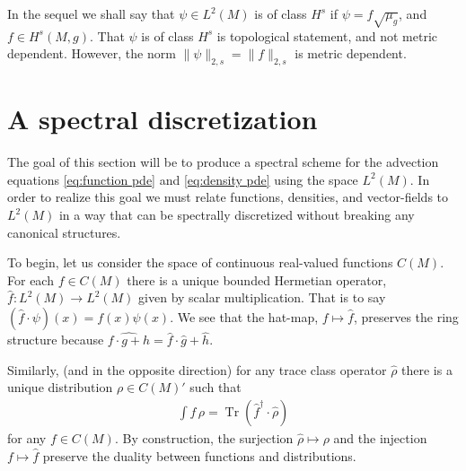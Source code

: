\documentclass[final,leqno]{siamltex1213}
\newcommand{\pder}[2]{\ensuremath{\frac{ \partial #1}{\partial #2}}}
\DeclareMathOperator{\Tr}{Tr}
\begin{document}
In the sequel we shall say that $\psi \in L^2(M)$ is of class $H^s$ if $\psi = f \sqrt{\mu_g}$, and $f \in H^s(M,g)$.
That $\psi$ is of class $H^{s}$ is topological statement, and not metric dependent.
However, the norm $\| \psi \|_{2,s} = \| f \|_{2,s}$ is metric dependent.

\section{A spectral discretization}
The goal of this section will be to produce a spectral scheme for the advection equations \eqref{eq:function pde} and \eqref{eq:density pde}
using the space $L^{2}(M)$.
In order to realize this goal we must relate functions, densities, and vector-fields to $L^{2}(M)$ in a way that can be spectrally discretized without breaking any canonical structures.

To begin, let us consider the space of continuous real-valued functions $C(M)$.
For each $f \in C(M)$ there is a unique bounded Hermetian operator, $\hat{f} : L^{2}(M) \to L^{2}(M)$ given by scalar multiplication.
That is to say $(\hat{f} \cdot \psi) (x) = f(x) \psi(x)$.
We see that the hat-map, $f \mapsto \hat{f}$, preserves the ring structure because $\widehat{f \cdot g + h} = \hat{f} \cdot \hat{g} + \hat{h}$.

Similarly, (and in the opposite direction) for any trace class operator $\hat{\rho}$ there is a unique distribution $\rho \in C(M)'$ such that 
\begin{align}
	 \int f \, \rho = \Tr ( \hat{f}^{\dagger} \cdot \hat{\rho} )
\end{align}
for any $f \in C(M)$.
By construction, the surjection $\hat{\rho} \mapsto \rho$ and the injection $f \mapsto \hat{f}$ preserve the duality between functions and distributions.

\end{document}
